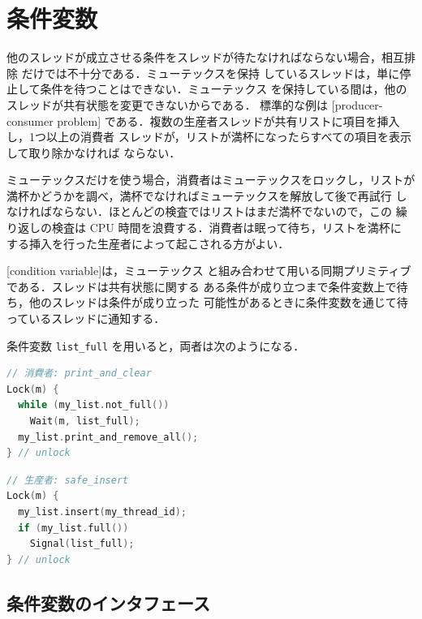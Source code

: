 \documentclass[../main.tex]{subfiles}
\begin{document}
\section{条件変数}
\label{sec:l03-condvar}

他のスレッドが成立させる条件をスレッドが待たなければならない場合，相互排除
だけでは不十分である．ミューテックスを保持
しているスレッドは，単に停止して条件を待つことはできない．ミューテックス
を保持している間は，他のスレッドが共有状態を変更できないからである．
標準的な例は
[producer-consumer problem]%
である．複数の生産者スレッドが共有リストに項目を挿入し，1つ以上の消費者
スレッドが，リストが満杯になったらすべての項目を表示して取り除かなければ
ならない．

ミューテックスだけを使う場合，消費者はミューテックスをロックし，リストが
満杯かどうかを調べ，満杯でなければミューテックスを解放して後で再試行
しなければならない．ほとんどの検査ではリストはまだ満杯でないので，この
繰り返しの検査は CPU 時間を浪費する．消費者は眠って待ち，リストを満杯に
する挿入を行った生産者によって起こされる方がよい．

\begin{definition}[条件変数]
  [condition variable]は，ミューテックス
  と組み合わせて用いる同期プリミティブである．スレッドは共有状態に関する
  ある条件が成り立つまで条件変数上で待ち，他のスレッドは条件が成り立った
  可能性があるときに条件変数を通じて待っているスレッドに通知する．
\end{definition}

条件変数 \texttt{list\_full} を用いると，両者は次のようになる．
\begin{lstlisting}[language=C, numbers=none]
// 消費者: print_and_clear
Lock(m) {
  while (my_list.not_full())
    Wait(m, list_full);
  my_list.print_and_remove_all();
} // unlock
\end{lstlisting}
\begin{lstlisting}[language=C, numbers=none]
// 生産者: safe_insert
Lock(m) {
  my_list.insert(my_thread_id);
  if (my_list.full())
    Signal(list_full);
} // unlock
\end{lstlisting}

\subsection{条件変数のインタフェース}
\end{document}
